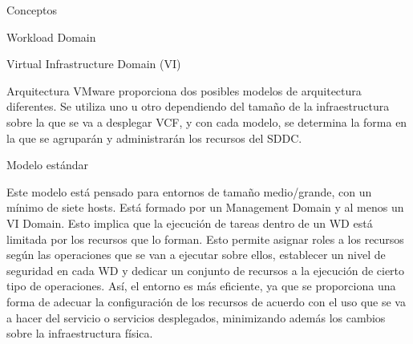 \begin{section}{Conceptos}
\begin{subsection}{Workload Domain}
\begin{subsubsection}{Virtual Infrastructure Domain (VI)}
 \end{subsubsection}

\end{subsection}




\begin{subsection}{Arquitectura}
VMware proporciona dos posibles modelos de arquitectura diferentes. Se utiliza uno u otro dependiendo del tamaño de la infraestructura sobre la que se va a desplegar VCF, y con cada modelo, se determina la forma en la que se agruparán y administrarán los recursos del SDDC.

\begin{subsubsection}{Modelo estándar}

Este modelo está pensado para entornos de tamaño medio/grande, con un mínimo de siete hosts. Está formado por un Management Domain y al menos un VI Domain. Esto implica que la ejecución de tareas dentro de un WD está limitada por los recursos que lo forman. Esto permite asignar roles a los recursos según las operaciones que se van a ejecutar sobre ellos, establecer un nivel de seguridad en cada WD y dedicar un conjunto de recursos a la ejecución de cierto tipo de operaciones. Así, el entorno es más eficiente, ya que se proporciona una forma de adecuar la configuración de los recursos de acuerdo con el uso que se va a hacer del servicio o servicios desplegados, minimizando además los cambios sobre la infraestructura física.


\end{subsubsection}
\end{subsection}
\end{section}
